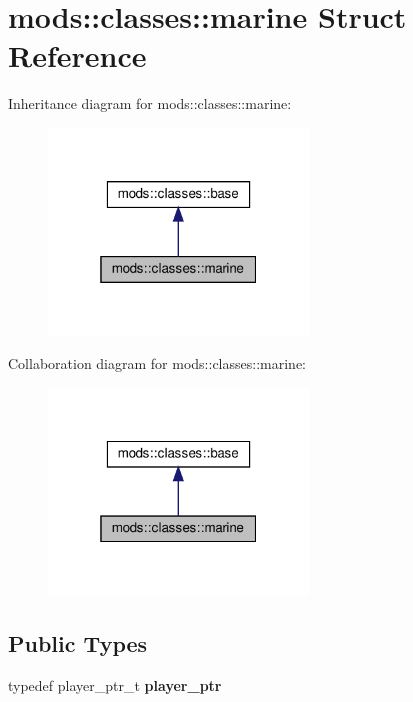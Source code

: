 \hypertarget{structmods_1_1classes_1_1marine}{}\section{mods\+:\+:classes\+:\+:marine Struct Reference}
\label{structmods_1_1classes_1_1marine}


Inheritance diagram for mods\+:\+:classes\+:\+:marine\+:
\nopagebreak
\begin{figure}[H]
\begin{center}
\leavevmode
\includegraphics[width=196pt]{structmods_1_1classes_1_1marine__inherit__graph}
\end{center}
\end{figure}


Collaboration diagram for mods\+:\+:classes\+:\+:marine\+:
\nopagebreak
\begin{figure}[H]
\begin{center}
\leavevmode
\includegraphics[width=196pt]{structmods_1_1classes_1_1marine__coll__graph}
\end{center}
\end{figure}
\subsection*{Public Types}
\begin{DoxyCompactItemize}
\item 
\mbox{\label{structmods_1_1classes_1_1marine_a08a8ee89c9b9977e1c348b901ba6f722}} 
typedef player\+\_\+ptr\+\_\+t {\bfseries player\+\_\+ptr}
\end{DoxyCompactItemize}
